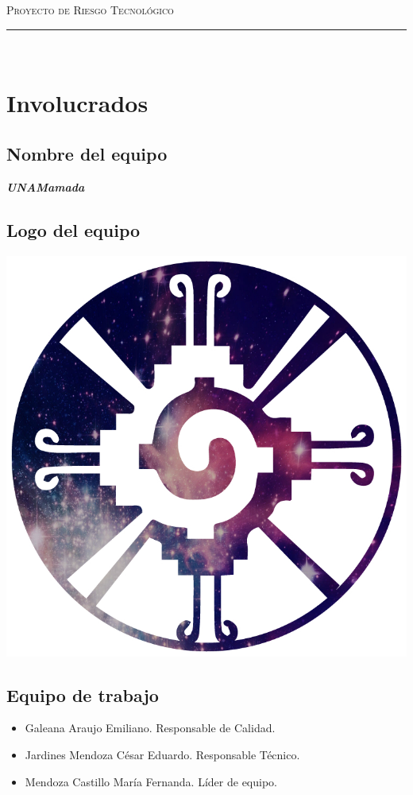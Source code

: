 \documentclass{article}
\begin{document}
\marginsize{2cm}{2cm}{1cm}{2cm} 

\begin{center}
  {\LARGE \scshape Proyecto de Riesgo Tecnológico\\\vspace{10mm} }
  \rule{0.8\textwidth}{.8pt}\\
\end{center}

\section*{Involucrados}
\subsection*{Nombre del equipo} \textit{\textbf{UNAMamada}}
\subsection*{Logo del equipo}
\begin{center}
  \includegraphics[scale=.2]{../imagenes/logo.jpg}
\end{center}

\subsection*{Equipo de trabajo}
\begin{itemize}
\item Galeana Araujo Emiliano. Responsable de Calidad.
\item Jardines Mendoza César Eduardo. Responsable Técnico.
\item Mendoza Castillo María Fernanda. Líder de equipo.
\end{itemize}
\end{document}
